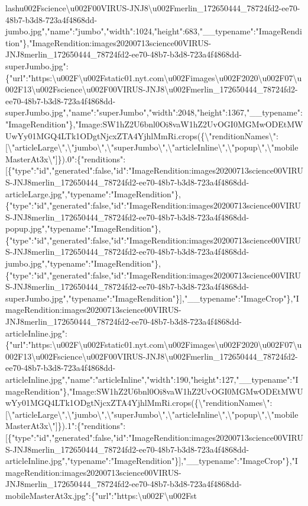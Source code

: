 lash{}u002Fscience\textbackslash{}u002F00VIRUS-JNJ8\textbackslash{}u002Fmerlin\_172650444\_78724fd2-ee70-48b7-b3d8-723a4f4868dd-jumbo.jpg","name":"jumbo","width":1024,"height":683,"\_\_typename":"ImageRendition"\},"ImageRendition:images20200713science00VIRUS-JNJ8merlin\_172650444\_78724fd2-ee70-48b7-b3d8-723a4f4868dd-superJumbo.jpg":\{"url":"https:\textbackslash{}u002F\textbackslash{}u002Fstatic01.nyt.com\textbackslash{}u002Fimages\textbackslash{}u002F2020\textbackslash{}u002F07\textbackslash{}u002F13\textbackslash{}u002Fscience\textbackslash{}u002F00VIRUS-JNJ8\textbackslash{}u002Fmerlin\_172650444\_78724fd2-ee70-48b7-b3d8-723a4f4868dd-superJumbo.jpg","name":"superJumbo","width":2048,"height":1367,"\_\_typename":"ImageRendition"\},"Image:SW1hZ2U6bnl0Oi8vaW1hZ2UvOGI0MGMwODEtMWUwYy01MGQ4LTk1ODgtNjcxZTA4YjhlMmRi.crops(\{\textbackslash{}"renditionNames\textbackslash{}":{[}\textbackslash{}"articleLarge\textbackslash{}",\textbackslash{}"jumbo\textbackslash{}",\textbackslash{}"superJumbo\textbackslash{}",\textbackslash{}"articleInline\textbackslash{}",\textbackslash{}"popup\textbackslash{}",\textbackslash{}"mobileMasterAt3x\textbackslash{}"{]}\}).0":\{"renditions":{[}\{"type":"id","generated":false,"id":"ImageRendition:images20200713science00VIRUS-JNJ8merlin\_172650444\_78724fd2-ee70-48b7-b3d8-723a4f4868dd-articleLarge.jpg","typename":"ImageRendition"\},\{"type":"id","generated":false,"id":"ImageRendition:images20200713science00VIRUS-JNJ8merlin\_172650444\_78724fd2-ee70-48b7-b3d8-723a4f4868dd-popup.jpg","typename":"ImageRendition"\},\{"type":"id","generated":false,"id":"ImageRendition:images20200713science00VIRUS-JNJ8merlin\_172650444\_78724fd2-ee70-48b7-b3d8-723a4f4868dd-jumbo.jpg","typename":"ImageRendition"\},\{"type":"id","generated":false,"id":"ImageRendition:images20200713science00VIRUS-JNJ8merlin\_172650444\_78724fd2-ee70-48b7-b3d8-723a4f4868dd-superJumbo.jpg","typename":"ImageRendition"\}{]},"\_\_typename":"ImageCrop"\},"ImageRendition:images20200713science00VIRUS-JNJ8merlin\_172650444\_78724fd2-ee70-48b7-b3d8-723a4f4868dd-articleInline.jpg":\{"url":"https:\textbackslash{}u002F\textbackslash{}u002Fstatic01.nyt.com\textbackslash{}u002Fimages\textbackslash{}u002F2020\textbackslash{}u002F07\textbackslash{}u002F13\textbackslash{}u002Fscience\textbackslash{}u002F00VIRUS-JNJ8\textbackslash{}u002Fmerlin\_172650444\_78724fd2-ee70-48b7-b3d8-723a4f4868dd-articleInline.jpg","name":"articleInline","width":190,"height":127,"\_\_typename":"ImageRendition"\},"Image:SW1hZ2U6bnl0Oi8vaW1hZ2UvOGI0MGMwODEtMWUwYy01MGQ4LTk1ODgtNjcxZTA4YjhlMmRi.crops(\{\textbackslash{}"renditionNames\textbackslash{}":{[}\textbackslash{}"articleLarge\textbackslash{}",\textbackslash{}"jumbo\textbackslash{}",\textbackslash{}"superJumbo\textbackslash{}",\textbackslash{}"articleInline\textbackslash{}",\textbackslash{}"popup\textbackslash{}",\textbackslash{}"mobileMasterAt3x\textbackslash{}"{]}\}).1":\{"renditions":{[}\{"type":"id","generated":false,"id":"ImageRendition:images20200713science00VIRUS-JNJ8merlin\_172650444\_78724fd2-ee70-48b7-b3d8-723a4f4868dd-articleInline.jpg","typename":"ImageRendition"\}{]},"\_\_typename":"ImageCrop"\},"ImageRendition:images20200713science00VIRUS-JNJ8merlin\_172650444\_78724fd2-ee70-48b7-b3d8-723a4f4868dd-mobileMasterAt3x.jpg":\{"url":"https:\textbackslash{}u002F\textbackslash{}u002Fst